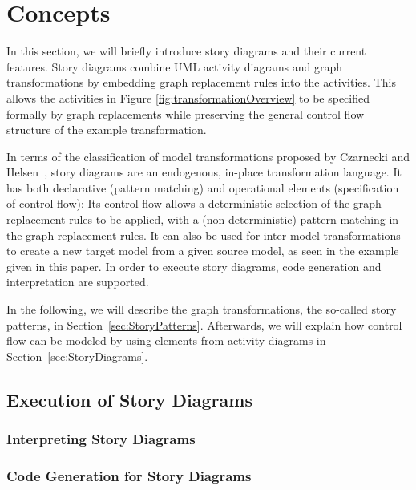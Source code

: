 \chapter{Concepts} \label{sec:Concepts}

In this section, we will briefly introduce story diagrams and their current features. 
Story diagrams combine
UML activity diagrams and graph transformations by embedding graph replacement rules into the activities.
This allows the activities in Figure \ref{fig:transformationOverview} to be specified formally by graph replacements while preserving the general control flow structure of the example transformation.

In terms of the classification of model transformations proposed by Czarnecki and Helsen~\cite{Czarnecki06}, story diagrams are an endogenous, in-place transformation language.
It has both declarative (pattern matching) and operational elements (specification of control flow):
Its control flow allows a deterministic selection of the graph replacement rules to be applied, with a (non-deterministic) pattern matching in the graph replacement rules.
It can also be used for inter-model transformations to create a new target model from a given source model, as seen in the example given in this paper. 
In order to execute story diagrams, code generation \cite{GBD07} and interpretation \cite{GHS09} are supported.

In the following, we will describe the graph transformations, the so-called story patterns, in Section~\ref{sec:StoryPatterns}.
Afterwards, we will explain how control flow can be modeled by using elements from activity diagrams in Section~\ref{sec:StoryDiagrams}.

	
	
	 
	
	
	
\section{Execution of Story Diagrams}

\subsection{Interpreting Story Diagrams}
\cite{GHS09}

\subsection{Code Generation for Story Diagrams}
\cite{GBD07}